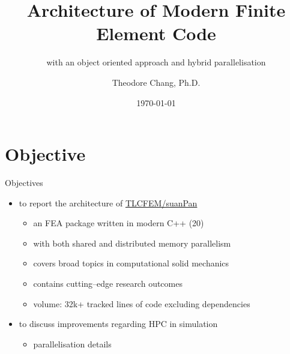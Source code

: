 \documentclass[fleqn,10pt]{beamer}
\title{Architecture of Modern Finite Element Code}
\subtitle{with an object oriented approach and hybrid parallelisation}
\author{Theodore Chang, Ph.D.}
\date{\today}
\begin{document}
\begin{frame}[plain]
\maketitle
\end{frame}
\section{Objective}
\begin{frame}{Objectives}
\begin{itemize}
\item to report the architecture of \href{https://github.com/TLCFEM/suanPan}{TLCFEM/suanPan}
\begin{itemize}
\item an FEA package written in modern C++ (20)
\item with both shared and distributed memory parallelism
\item covers broad topics in computational solid mechanics
\item contains cutting--edge research outcomes
\item volume: 32k+ tracked lines of code excluding dependencies
\end{itemize}
\item to discuss improvements regarding HPC in simulation
\begin{itemize}
\item parallelisation details
\end{itemize}
\end{itemize}
\end{frame}
\end{document}
